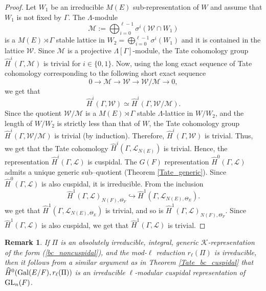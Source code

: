 \documentclass[10pt, reqno]{amsart}
\theoremstyle{plain}
\numberwithin{equation}{section} \newcommand{\di}{\operatorname{dim}}
\newtheorem{remark}[theorem]{Remark}
\begin{document}
\begin{proof}
Let $W_1$ be an irreducible $M(E)$ sub-representation of $W$
and assume that $W_1$ is not fixed by $\Gamma$. 
The $\Lambda$-module
$$ \mathcal{M}:=\bigoplus_{i=0}
^{\ell-1}\sigma^i (\mathcal{W}\cap W_1) $$ is a $M(E)\rtimes \Gamma$
stable lattice in $W_2=\bigoplus_{i=0}^{\ell-1} \sigma^i(W_1)$ and it
is contained in the lattice $\mathcal{W}$. Since $\mathcal{M}$ is a
projective $\Lambda[\Gamma]$-module, the Tate cohomology group
$\widehat{H}^i (\Gamma, \mathcal{M})$ is trivial for $i\in
\{0,1\}$. Now, using the long exact sequence of Tate cohomology
corresponding to the following short exact sequence
$$ 0\longrightarrow \mathcal{M}\longrightarrow
\mathcal{W}\longrightarrow \mathcal{W}/\mathcal{M}
\longrightarrow 0, $$ 
we get that
$$\widehat{H}^i(\Gamma, \mathcal{W})\simeq
\widehat{H}^i(\Gamma, \mathcal{W}
/\mathcal{M}). $$ Since the quotient
$\mathcal{W}/\mathcal{M}$ is a
$M(E)\rtimes \Gamma$ stable $\Lambda$-lattice in
$W/W_2$, and the length of $W/W_2$ is
strictly less than that of $W$, the Tate cohomology group
$\widehat{H}^i(\Gamma, \mathcal{W} /\mathcal{M})$ is trivial (by
induction). Therefore, $\widehat{H}^i(\Gamma, \mathcal{W})$ is
trivial. 
Thus, we get that the Tate cohomology 
$\widehat{H}^i(\Gamma, \mathcal{L}_{N(E)})$ is trivial. 
Hence, the representation $\widehat{H}^i(\Gamma, \mathcal{L})$ is cuspidal.
The $G(F)$ representation 
$\widehat{H}^0(\Gamma, \mathcal{L})$ admits a unique
generic sub--quotient (Theorem \ref{Tate_generic}).  Since
$\widehat{H}^0(\Gamma, \mathcal{L})$ is also cuspidal, it is
irreducible. From the inclusion 
$$ \widehat{H}^1(\Gamma, \mathcal{L})_{N(F),\Theta_F}
\hookrightarrow \widehat{H}^1 (\Gamma, \mathcal{L}_{N(E),\Theta_E}). $$
we get that
$\widehat{H}^1(\Gamma, \mathcal{L}_{N(E),\Theta_E})$ is trivial, and so is
$\widehat{H}^1(\Gamma, \mathcal{L})_{N(F), \Theta_F}$. Since
$\widehat{H}^1(\Gamma, \mathcal{L})$ is also cuspidal, we get that
$\widehat{H}^1(\Gamma, \mathcal{L})$ is trivial.
\end{proof}
\begin{remark}\label{Remark_Tate_bc_cuspidal}
\normalfont If $\Pi$ is an absolutely irreducible, integral, generic
$\mathcal{K}$-representation of the form (\ref{bc_noncuspidal}), and
the mod-$\ell$ reduction $r_\ell(\Pi)$ is irreducible, then it
follows from a similar argument as in Theorem
\ref{Tate_bc_cuspidal} that 
$\widehat{H}^0({\rm Gal}(E/F), r_\ell(\Pi))$ is an
irreducible $\ell$-modular cuspidal representation of ${\rm GL}_n(F)$.
\end{remark}
\end{document}
